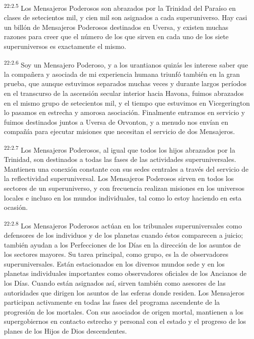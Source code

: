\par
\textsuperscript{22:2.5} Los Mensajeros Poderosos son abrazados por la Trinidad del Paraíso en clases de setecientos mil, y cien mil son asignados a cada superuniverso. Hay casi un billón de Mensajeros Poderosos destinados en Uversa, y existen muchas razones para creer que el número de los que sirven en cada uno de los siete superuniversos es exactamente el mismo.

\par
\textsuperscript{22:2.6} Soy un Mensajero Poderoso, y a los urantianos quizás les interese saber que la compañera y asociada de mi experiencia humana triunfó también en la gran prueba, que aunque estuvimos separados muchas veces y durante largos períodos en el transcurso de la ascensión secular interior hacia Havona, fuimos abrazados en el mismo grupo de setecientos mil, y el tiempo que estuvimos en Vicegerington lo pasamos en estrecha y amorosa asociación. Finalmente entramos en servicio y fuimos destinados juntos a Uversa de Orvonton, y a menudo nos envían en compañía para ejecutar misiones que necesitan el servicio de dos Mensajeros.

\par
\textsuperscript{22:2.7} Los Mensajeros Poderosos, al igual que todos los hijos abrazados por la Trinidad, son destinados a todas las fases de las actividades superuniversales. Mantienen una conexión constante con sus sedes centrales a través del servicio de la reflectividad superuniversal. Los Mensajeros Poderosos sirven en todos los sectores de un superuniverso, y con frecuencia realizan misiones en los universos locales e incluso en los mundos individuales, tal como lo estoy haciendo en esta ocasión.

\par
\textsuperscript{22:2.8} Los Mensajeros Poderosos actúan en los tribunales superuniversales como defensores de los individuos y de los planetas cuando éstos comparecen a juicio; también ayudan a los Perfecciones de los Días en la dirección de los asuntos de los sectores mayores. Su tarea principal, como grupo, es la de observadores superuniversales. Están estacionados en los diversos mundos sede y en los planetas individuales importantes como observadores oficiales de los Ancianos de los Días. Cuando están asignados así, sirven también como asesores de las autoridades que dirigen los asuntos de las esferas donde residen. Los Mensajeros participan activamente en todas las fases del programa ascendente de la progresión de los mortales. Con sus asociados de origen mortal, mantienen a los supergobiernos en contacto estrecho y personal con el estado y el progreso de los planes de los Hijos de Dios descendentes.

